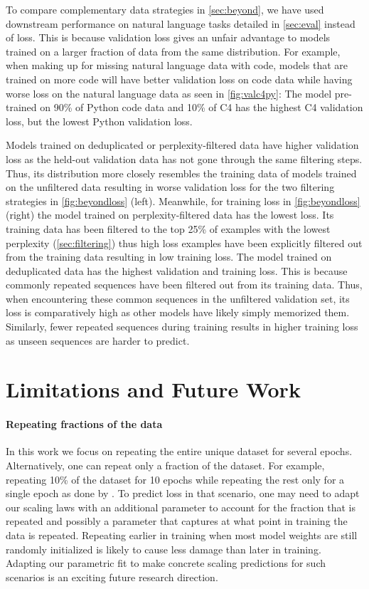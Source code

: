 \documentclass{article}
\begin{document}
To compare complementary data strategies in \autoref{sec:beyond}, we have used downstream performance on natural language tasks detailed in \autoref{sec:eval} instead of loss. This is because validation loss gives an unfair advantage to models trained on a larger fraction of data from the same distribution. For example, when making up for missing natural language data with code, models that are trained on more code will have better validation loss on code data while having worse loss on the natural language data as seen in \autoref{fig:valc4py}: The model pre-trained on 90\% of Python code data and 10\% of C4 has the highest C4 validation loss, but the lowest Python validation loss.

Models trained on deduplicated or perplexity-filtered data have higher validation loss as the held-out validation data has not gone through the same filtering steps. Thus, its distribution more closely resembles the training data of models trained on the unfiltered data resulting in worse validation loss for the two filtering strategies in \autoref{fig:beyondloss} (left). Meanwhile, for training loss in \autoref{fig:beyondloss} (right) the model trained on perplexity-filtered data has the lowest loss. Its training data has been filtered to the top 25\% of examples with the lowest perplexity (\autoref{sec:filtering}) thus high loss examples have been explicitly filtered out from the training data resulting in low training loss. The model trained on deduplicated data has the highest validation and training loss. This is because commonly repeated sequences have been filtered out from its training data. Thus, when encountering these common sequences in the unfiltered validation set, its loss is comparatively high as other models have likely simply memorized them. Similarly, fewer repeated sequences during training results in higher training loss as unseen sequences are harder to predict.

\FloatBarrier

\section{Limitations and Future Work}
\label{sec:limits}

\paragraph{Repeating fractions of the data} In this work we focus on repeating the entire unique dataset for several epochs. Alternatively, one can repeat only a fraction of the dataset. For example, repeating 10\% of the dataset for 10 epochs while repeating the rest only for a single epoch as done by \citet{hernandez2022scaling}. To predict loss in that scenario, one may need to adapt our scaling laws with an additional parameter to account for the fraction that is repeated and possibly a parameter that captures at what point in training the data is repeated. Repeating earlier in training when most model weights are still randomly initialized is likely to cause less damage than later in training. Adapting our parametric fit to make concrete scaling predictions for such scenarios is an exciting future research direction.
\end{document}
